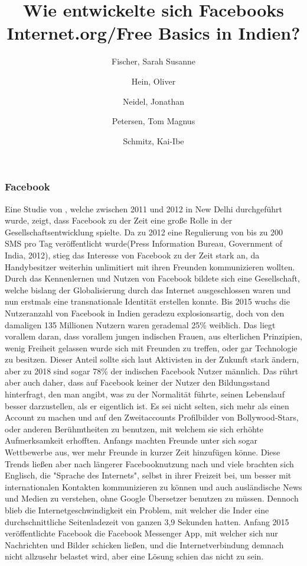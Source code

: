 \documentclass{article}
\title{Wie entwickelte sich Facebooks Internet.org/Free Basics in Indien?}
\author{
  Fischer, Sarah Susanne\\
  \and
  Hein, Oliver\\
  \and
  Neidel, Jonathan\\
  \and
  Petersen, Tom Magnus\\
  \and
  Schmitz, Kai-Ibe\\
}
\begin{document}
\maketitle
\subsubsection {Facebook}
Eine Studie von \textcite{empowermentThroughFacebook}, welche zwischen 2011 und 2012 in New Delhi durchgeführt wurde, zeigt, dass Facebook zu der Zeit eine große Rolle in der Gesellschaftsentwicklung spielte. 
\medskip
Da zu 2012 eine Regulierung von bis zu 200 SMS pro Tag veröffentlicht wurde(Press Information Bureau,
Government of India, 2012), stieg das Interesse von Facebook zu der Zeit stark an,
da Handybesitzer weiterhin unlimitiert mit ihren Freunden kommunizieren wollten.
Durch das Kennenlernen und Nutzen von Facebook bildete sich eine Gesellschaft, welche bislang der Globalisierung
durch das Internet ausgeschlossen waren und nun erstmals eine transnationale Identität erstellen konnte.
\medskip
Bis 2015 wuchs die Nutzeranzahl von Facebook in Indien geradezu explosionsartig, doch von den damaligen 135 Millionen Nutzern waren gerademal 25\% weiblich\autocite{slideshareIndia}. Das liegt vorallem daran, dass vorallem jungen indischen Frauen, aus elterlichen Prinzipien, 
wenig Freiheit gelassen wurde sich mit Freunden zu treffen, oder gar Technologie
zu besitzen. Dieser Anteil sollte sich laut Aktivisten in der Zukunft stark ändern, 
aber zu 2018 sind sogar 78\% der indischen Facebook Nutzer männlich. 
\medskip
Das rührt aber auch daher, dass auf Facebook keiner der Nutzer den Bildungsstand hinterfragt, den man angibt, was zu der Normalität führte, seinen Lebenslauf besser darzustellen, als er eigentlich ist. Es sei nicht selten, sich mehr als einen Account zu machen und auf den Zweitaccounts Profilbilder von Bollywood-Stars, oder anderen Berühmtheiten zu benutzen,
mit welchem sie sich erhöhte Aufmerksamkeit erhofften. 
Anfangs machten Freunde unter sich sogar Wettbewerbe aus, wer mehr Freunde in kurzer Zeit hinzufügen könne.
Diese Trends ließen aber nach längerer Facebooknutzung nach und viele brachten sich Englisch, die "Sprache des Internets", 
selbst in ihrer Freizeit bei, um besser mit internationalen Kontakten
kommunizieren zu können und auch ausländische News und Medien zu verstehen, ohne Google Übersetzer benutzen zu müssen.
\medskip
Dennoch blieb die Internetgeschwindigkeit ein Problem, mit welcher die Inder eine durchschnittliche Seitenladezeit von ganzen 3,9 Sekunden hatten\autocite{mashable}. Anfang 2015 veröffentlichte Facebook die Facebook Messenger App, mit welcher sich nur Nachrichten und Bilder schicken ließen, und die Internetverbindung demnach nicht allzusehr belastet wird, aber eine Lösung schien das nicht zu sein.
\medskip



\end{document}
